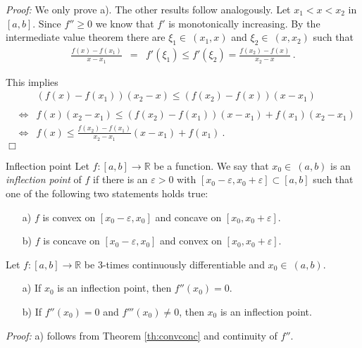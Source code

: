 {\em Proof:} We only prove a). The other results follow analogously. 
  Let $x_1<x<x_2$ in $[a,b]$. Since $f''\geq 0$ we know that $f'$ is monotonically increasing.
  By the intermediate value theorem there are $\xi_1\in~(x_1,x)$ and $\xi_2\in~(x,x_2)$ such that
  \begin{eqnarray*}
    \frac{f(x)-f(x_1)}{x-x_1} &=& f'(\xi_1) \leq f'(\xi_2) = \frac{f(x_2)-f(x)}{x_2-x} \ .
  \end{eqnarray*}

  This implies
  \begin{eqnarray*}
    && (f(x)-f(x_1))(x_2-x) \leq (f(x_2)-f(x))(x-x_1) \\ \\
    &\Leftrightarrow& f(x)(x_2-x_1) \leq (f(x_2)-f(x_1))(x-x_1)+f(x_1)(x_2-x_1) \\
    &\Leftrightarrow& f(x) \leq \frac{f(x_2)-f(x_1)}{x_2-x_1}(x-x_1)+f(x_1)\ .   
  \end{eqnarray*}
\hfill$\Box$

\begin{Definition}{Inflection point}
    Let $f:[a,b]\rightarrow \mathbb{R}$ be a function. We say that $x_0\in ~(a,b)$ is an \emph{inflection point} of $f$ if there is an $\varepsilon>0$ with 
    $[x_0-\varepsilon,x_0+\varepsilon]\subset[a,b]$ such that one of the following two statements holds true:
    \begin{enumerate}
     \item[a)] $f$ is convex on $[x_0-\varepsilon,x_0]$ and concave on $[x_0,x_0+\varepsilon]$.
     \item[b)] $f$ is concave on $[x_0-\varepsilon,x_0]$ and convex on $[x_0,x_0+\varepsilon]$.
    \end{enumerate}
\end{Definition}

\begin{Theorem}{}
    Let $f:[a,b]\rightarrow \mathbb{R}$ be 3-times continuously differentiable and $x_0\in~(a,b)$. 
  \begin{enumerate}
   \item[a)] If $x_0$ is an inflection point, then $f''(x_0)=0$.
   \item[b)] If $f''(x_0)=0$ and $f'''(x_0)\neq 0$, then $x_0$ is an inflection point.  
  \end{enumerate}
\end{Theorem}

{\em Proof:} 
a) follows from Theorem \ref{th:convconc} and continuity of $f''$.

